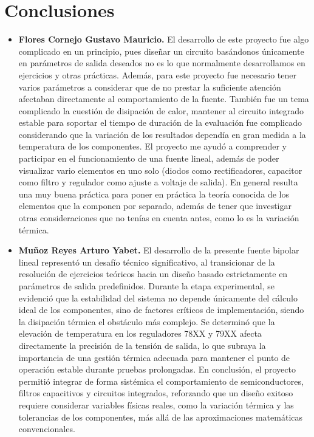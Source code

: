 \documentclass[journal]{IEEEtran}
\begin{document}
\section{Conclusiones}
\begin{itemize}
    \item \textbf{Flores Cornejo Gustavo Mauricio.}
    \newline 
    El desarrollo de este proyecto fue algo complicado en un principio, pues diseñar un circuito basándonos únicamente en parámetros de salida deseados no es lo que normalmente desarrollamos en ejercicios y otras prácticas. Además, para este proyecto fue necesario tener varios parámetros a considerar que de no prestar la suficiente atención afectaban directamente al comportamiento de la fuente.
    También fue un tema complicado la cuestión de disipación de calor, mantener al circuito integrado estable para soportar el tiempo de duración de la evaluación fue complicado considerando que la variación de los resultados dependía en gran medida a la temperatura de los componentes. El proyecto me ayudó a comprender y participar en el funcionamiento de una fuente lineal, además de poder visualizar vario elementos en uno solo 
    (diodos como rectificadores, capacitor como filtro y regulador como ajuste a voltaje de salida).
    En general resulta una muy buena práctica para poner en práctica la teoría conocida de los elementos que la componen por separado, además de tener que investigar otras consideraciones que no tenías en cuenta antes, como lo es la variación térmica.
    \newline 
    \item \textbf{Muñoz Reyes Arturo Yabet.}
    \newline El desarrollo de la presente fuente bipolar lineal representó un desafío técnico significativo, al transicionar de la resolución de ejercicios teóricos hacia un diseño basado estrictamente en parámetros de salida predefinidos. Durante la etapa experimental, se evidenció que la estabilidad del sistema no depende únicamente del cálculo ideal de los componentes, sino de factores críticos de implementación, siendo la disipación térmica el obstáculo más complejo. Se determinó que la elevación de temperatura en los reguladores 78XX y 79XX afecta directamente la precisión de la tensión de salida, lo que subraya la importancia de una gestión térmica adecuada para mantener el punto de operación estable durante pruebas prolongadas. En conclusión, el proyecto permitió integrar de forma sistémica el comportamiento de semiconductores, filtros capacitivos y circuitos integrados, reforzando que un diseño exitoso requiere considerar variables físicas reales, como la variación térmica y las tolerancias de los componentes, más allá de las aproximaciones matemáticas convencionales.
    

\end{itemize}
\end{document}
